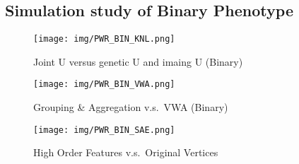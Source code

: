 \subsection{Simulation study of Binary Phenotype}
% 
\begin{figure}[!htbp]
  \centering
  \texttt{[image: img/PWR\_BIN\_KNL.png]}
  \caption{Joint U versus genetic U and imaing U (Binary)}\label{fig:PWR_BIN_KNL}
\end{figure}
% 
\begin{figure}[!htbp]
  \centering
  \texttt{[image: img/PWR\_BIN\_VWA.png]}
  \caption{Grouping \& Aggregation v.s.\ VWA (Binary)}\label{fig:PWR_BIN_VWA}
\end{figure}
% 
\begin{figure}[!htbp]
  \centering
  \texttt{[image: img/PWR\_BIN\_SAE.png]}
  \caption{High Order Features v.s.\ Original Vertices}\label{fig:PWR_BIN_SAE}
\end{figure}
